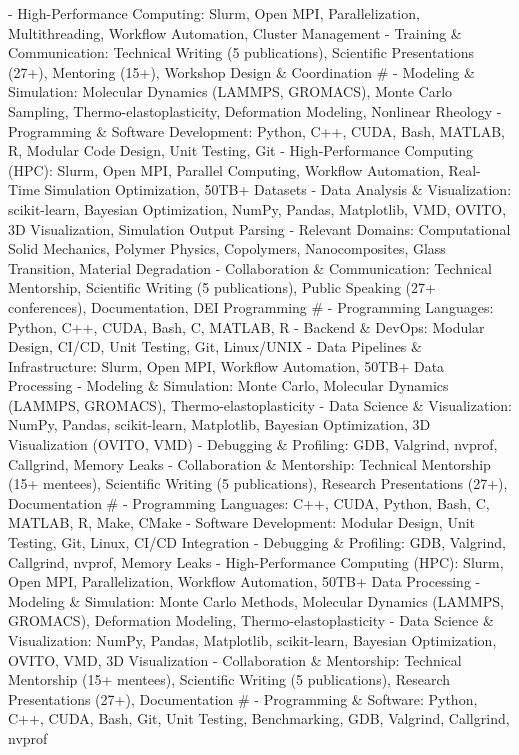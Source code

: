 - High-Performance Computing: Slurm, Open MPI, Parallelization, Multithreading, Workflow Automation, Cluster Management
- Training \& Communication: Technical Writing (5 publications), Scientific Presentations (27+), Mentoring (15+), Workshop Design \& Coordination
#
- Modeling \& Simulation: Molecular Dynamics (LAMMPS, GROMACS), Monte Carlo Sampling, Thermo-elastoplasticity, Deformation Modeling, Nonlinear Rheology
- Programming \& Software Development: Python, C++, CUDA, Bash, MATLAB, R, Modular Code Design, Unit Testing, Git
- High-Performance Computing (HPC): Slurm, Open MPI, Parallel Computing, Workflow Automation, Real-Time Simulation Optimization, 50TB+ Datasets
- Data Analysis \& Visualization: scikit-learn, Bayesian Optimization, NumPy, Pandas, Matplotlib, VMD, OVITO, 3D Visualization, Simulation Output Parsing
- Relevant Domains: Computational Solid Mechanics, Polymer Physics, Copolymers, Nanocomposites, Glass Transition, Material Degradation
- Collaboration \& Communication: Technical Mentorship, Scientific Writing (5 publications), Public Speaking (27+ conferences), Documentation, DEI Programming
#
- Programming Languages: Python, C++, CUDA, Bash, C, MATLAB, R
- Backend \& DevOps: Modular Design, CI/CD, Unit Testing, Git, Linux/UNIX
- Data Pipelines \& Infrastructure: Slurm, Open MPI, Workflow Automation, 50TB+ Data Processing
- Modeling \& Simulation: Monte Carlo, Molecular Dynamics (LAMMPS, GROMACS), Thermo-elastoplasticity
- Data Science \& Visualization: NumPy, Pandas, scikit-learn, Matplotlib, Bayesian Optimization, 3D Visualization (OVITO, VMD)
- Debugging \& Profiling: GDB, Valgrind, nvprof, Callgrind, Memory Leaks
- Collaboration \& Mentorship: Technical Mentorship (15+ mentees), Scientific Writing (5 publications), Research Presentations (27+), Documentation
#
- Programming Languages: C++, CUDA, Python, Bash, C, MATLAB, R, Make, CMake
- Software Development: Modular Design, Unit Testing, Git, Linux, CI/CD Integration
- Debugging \& Profiling: GDB, Valgrind, Callgrind, nvprof, Memory Leaks
- High-Performance Computing (HPC): Slurm, Open MPI, Parallelization, Workflow Automation, 50TB+ Data Processing
- Modeling \& Simulation: Monte Carlo Methods, Molecular Dynamics (LAMMPS, GROMACS), Deformation Modeling, Thermo-elastoplasticity
- Data Science \& Visualization: NumPy, Pandas, Matplotlib, scikit-learn, Bayesian Optimization, OVITO, VMD, 3D Visualization
- Collaboration \& Mentorship: Technical Mentorship (15+ mentees), Scientific Writing (5 publications), Research Presentations (27+), Documentation
#
- Programming \& Software: Python, C++, CUDA, Bash, Git, Unit Testing, Benchmarking, GDB, Valgrind, Callgrind, nvprof
